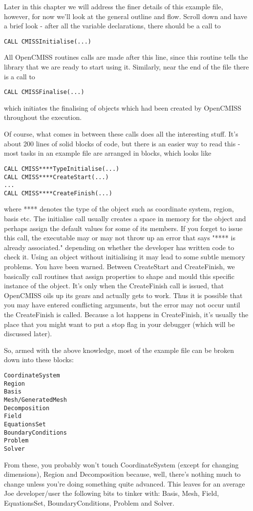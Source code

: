 Later in this chapter we will address the finer details of this example file, however, for
now we'll look at the general outline and flow. Scroll down and have a brief look - after
all the variable declarations, there should be a call to 
\begin{lstlisting}
CALL CMISSInitialise(...)
\end{lstlisting}
All OpenCMISS routines calls are made after this line, since this routine tells the library
that we are ready to start using it. Similarly, near the end of the file there is a call to
\begin{lstlisting}
CALL CMISSFinalise(...)
\end{lstlisting}
which initiates the finalising of objects which had been created by OpenCMISS throughout
the execution.

Of course, what comes in between these calls does all the interesting stuff. It's about 200 
lines of solid blocks of code, but there is an easier way to read this - most tasks in an
example file are arranged in blocks, which looks like
\begin{lstlisting}
CALL CMISS****TypeInitialise(...)
CALL CMISS****CreateStart(...)
...
CALL CMISS****CreateFinish(...)
\end{lstlisting}
where **** denotes the type of the object such as coordinate system, region, basis etc. 
The initialise call usually creates a space in memory for the object and perhaps assign the
default values for some of its members. If you forget to issue this call, the executable may
or may not throw up an error that says "**** is already associated." depending on whether the 
developer has written code to check it. Using an object without initialising it may lead to 
some subtle memory problems. You have been warned.
Between CreateStart and CreateFinish, we basically call routines that assign properties to 
shape and mould this specific instance of the object. It's only when the CreateFinish call 
is issued, that OpenCMISS oils up its gears and actually gets to work. Thus it is possible that
you may have entered conflicting arguments, but the error may not occur until the CreateFinish
is called. Because a lot happens in CreateFinish, it's usually the place that you might want
to put a stop flag in your debugger (which will be discussed later).

So, armed with the above knowledge, most of the example file can be broken down into these 
blocks:
\begin{lstlisting}
CoordinateSystem
Region
Basis
Mesh/GeneratedMesh
Decomposition
Field
EquationsSet
BoundaryConditions
Problem
Solver
\end{lstlisting}
From these, you probably won't touch CoordinateSystem (except for changing dimensions), Region 
and Decomposition because, well, there's nothing much to change unless you're doing something
quite advanced. This leaves for an average Joe developer/user the following bits to tinker with:
Basis, Mesh, Field, EquationsSet, BoundaryConditions, Problem and Solver.

